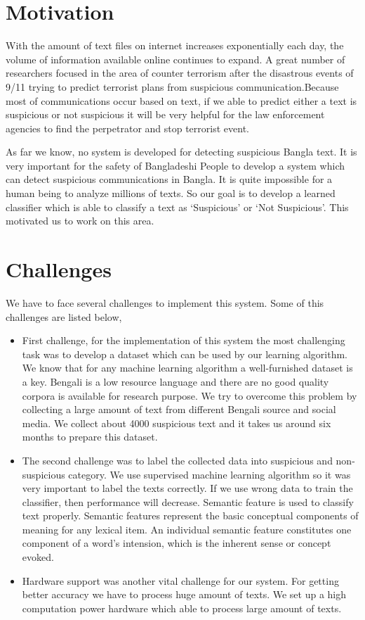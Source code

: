 \section{Motivation}
With the amount of text files on internet increases exponentially each day, the volume of information available online continues to expand. A great number of researchers focused in the area of counter terrorism after the disastrous events of  9/11 trying to predict terrorist plans from suspicious communication.Because most of communications occur based on text, if we able to predict either a text is suspicious or not suspicious it will be very helpful for the law enforcement agencies to find the perpetrator and stop terrorist event.\par 
\vspace{.3cm}
As far we know, no system is developed for detecting suspicious Bangla text. It is very important for the safety of Bangladeshi People to develop a system   which can detect suspicious communications in Bangla. It is quite impossible for a human being to analyze millions of texts. So our goal is to develop a learned classifier which is able to classify a text as ‘Suspicious’ or ‘Not Suspicious’. This motivated us to work on this area.

\section{Challenges}
We have to face several challenges to implement this system. Some of this challenges are listed below, 

\begin{itemize}
    \item First challenge, for the implementation of this system the most challenging task was to develop a dataset which can be used by our learning algorithm. We know that for any machine learning algorithm a well-furnished dataset is a key. Bengali is a low resource language and there are no good quality corpora is available for research purpose. We try to overcome this problem by collecting a large amount of text from different Bengali source and social media. We collect about 4000 suspicious text and it takes us around six months to prepare this dataset.
    
    \item The second challenge was to label the collected data into suspicious and non-suspicious category. We use supervised machine learning algorithm so it was very important to label the texts correctly. If we use wrong data to train the classifier, then performance will decrease. Semantic feature is used to classify text properly. Semantic features represent the basic conceptual components of meaning for any lexical item. An individual semantic feature constitutes one component of a word’s intension, which is the inherent sense or concept evoked.
    
    \item Hardware support was another vital challenge for our system. For getting better accuracy we have to process huge amount of texts. We set up a high computation power hardware which able to process large amount of texts.
\end{itemize}

